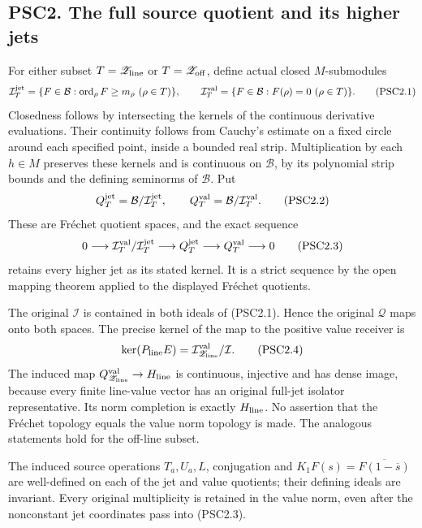 \subsection{PSC2. The full source quotient and its higher
jets}\label{psc2.-the-full-source-quotient-and-its-higher-jets}

For either subset \(T=\mathscr Z_{\rm line}\) or
\(T=\mathscr Z_{\rm off}\), define actual closed \(M\)-submodules \[
\mathcal I_T^{\rm jet}=\{F\in\mathcal B:\operatorname{ord}_\rho F\ge m_\rho\ (\rho\in T)\},
\qquad
\mathcal I_T^{\rm val}=\{F\in\mathcal B:F(\rho)=0\ (\rho\in T)\}.
\tag{PSC2.1}
\] Closedness follows by intersecting the kernels of the continuous
derivative evaluations. Their continuity follows from Cauchy's estimate
on a fixed circle around each specified point, inside a bounded real
strip. Multiplication by each \(h\in M\) preserves these kernels and is
continuous on \(\mathcal B\), by its polynomial strip bounds and the
defining seminorms of \(\mathcal B\). Put \[
Q_T^{\rm jet}=\mathcal B/\mathcal I_T^{\rm jet},\qquad
Q_T^{\rm val}=\mathcal B/\mathcal I_T^{\rm val}.
\tag{PSC2.2}
\] These are Fréchet quotient spaces, and the exact sequence \[
0\longrightarrow\mathcal I_T^{\rm val}/\mathcal I_T^{\rm jet}
\longrightarrow Q_T^{\rm jet}\longrightarrow Q_T^{\rm val}
\longrightarrow0
\tag{PSC2.3}
\] retains every higher jet as its stated kernel. It is a strict
sequence by the open mapping theorem applied to the displayed Fréchet
quotients.

The original \(\mathcal I\) is contained in both ideals of (PSC2.1).
Hence the original \(\mathcal Q\) maps onto both spaces. The precise
kernel of the map to the positive value receiver is \[
\ker(P_{\rm line}E)=\mathcal I_{\mathscr Z_{\rm line}}^{\rm val}/\mathcal I.
\tag{PSC2.4}
\] The induced map
\(Q_{\mathscr Z_{\rm line}}^{\rm val}\to H_{\rm line}\) is continuous,
injective and has dense image, because every finite line-value vector
has an original full-jet isolator representative. Its norm completion is
exactly \(H_{\rm line}\). No assertion that the Fréchet topology equals
the value norm topology is made. The analogous statements hold for the
off-line subset.

The induced source operations \(T_a,U_a,L\), conjugation and
\(K_1F(s)=\overline{F(1-\overline s)}\) are well-defined on each of the
jet and value quotients; their defining ideals are invariant. Every
original multiplicity is retained in the value norm, even after the
nonconstant jet coordinates pass into (PSC2.3).


